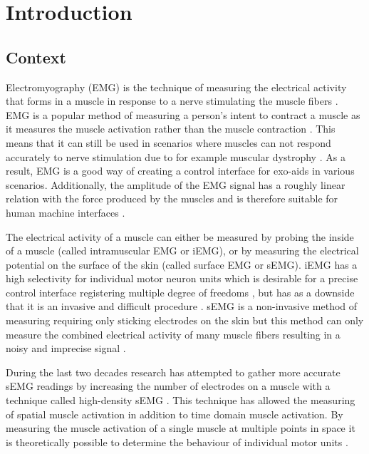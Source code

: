 \chapter{Introduction}
\section{Context}
Electromyography (EMG) is the technique of measuring the electrical activity that forms in a muscle in response to a nerve stimulating the muscle fibers \cite{biomechanics_research_methods} \cite{wikipedia_emg}. EMG is a popular method of measuring a person's intent to contract a muscle as it measures the muscle activation rather than the muscle contraction \cite{control_interfaces_intention_detection}\cite{human_robotics}. This means that it can still be used in scenarios where muscles can not respond accurately to nerve stimulation due to for example muscular dystrophy \cite{emg_arm_function_boys_pilot}. As a result, EMG is a good way of creating a control interface for exo-aids in various scenarios. Additionally, the amplitude of the EMG signal has a roughly linear relation with the force produced by the muscles and is therefore suitable for human machine interfaces \cite{adaptive_filter_dry_electrode}.

The electrical activity of a muscle can either be measured by probing the inside of a muscle (called intramuscular EMG or iEMG), or by measuring the electrical potential on the surface of the skin (called surface EMG or sEMG). iEMG has a high selectivity for individual motor neuron units which is desirable for a precise control interface registering multiple degree of freedoms \cite{semg_vs_iemg}, but has as a downside that it is an invasive and difficult procedure \cite{intramuscular_emg_signals}. sEMG is a non-invasive method of measuring requiring only sticking electrodes on the skin but this method can only measure the combined electrical activity of many muscle fibers resulting in a noisy and imprecise signal \cite{wiki:Electromyography}. 

During the last two decades research has attempted to gather more accurate sEMG readings by increasing the number of electrodes on a muscle with a technique called high-density sEMG \cite{high_density_semg}. 
This technique has allowed the measuring of spatial muscle activation in addition to time domain muscle activation. By measuring the muscle activation of a single muscle at multiple points in space it is theoretically possible to determine the behaviour of individual motor units \cite{high_density_semg_clinical_applications}.

